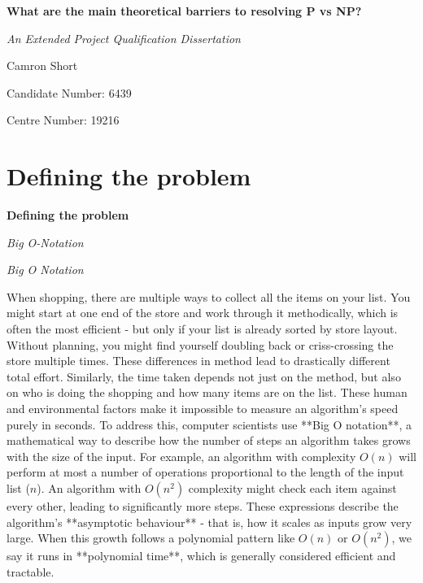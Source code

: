 \documentclass[12pt]{report}
\begin{document}
\begin{titlepage}
    \centering
    \vspace*{3cm}
    
    {\Huge\bfseries What are the main theoretical barriers to resolving P vs NP?\par}
    \vspace{1.5cm}
    
    {\Large\itshape An Extended Project Qualification Dissertation\par}
    \vspace{2cm}
    
    {\Large Camron Short\par}
    \vspace{0.5cm}
    {\large Candidate Number: 6439\par}
    {\large Centre Number: 19216\par}
    \vspace{2cm}
    
    \thispagestyle{empty}
\end{titlepage}

\section*{Defining the problem}
\begin{center}
    \vspace*{3cm}
    {\Huge\bfseries Defining the problem\par}
    \vspace{0.5cm}
    {\Large\itshape Big O-Notation\par}
\end{center}

{\Large\itshape Big O Notation\par}

When shopping, there are multiple ways to collect all the items on your list.
You might start at one end of the store and work through it methodically, which is often the most efficient - but only if your list is already sorted by store layout.
Without planning, you might find yourself doubling back or criss-crossing the store multiple times.
These differences in method lead to drastically different total effort.
Similarly, the time taken depends not just on the method, but also on who is doing the shopping and how many items are on the list.
These human and environmental factors make it impossible to measure an algorithm's speed purely in seconds.
To address this, computer scientists use **Big O notation**, a mathematical way to describe how the number of steps an algorithm takes grows with the size of the input.
For example, an algorithm with complexity $O(n)$ will perform at most a number of operations proportional to the length of the input list ($n$).
An algorithm with $O(n^2)$ complexity might check each item against every other, leading to significantly more steps.
These expressions describe the algorithm’s **asymptotic behaviour** - that is, how it scales as inputs grow very large. When this growth follows a polynomial pattern like $O(n)$ or $O(n^2)$, we say it runs in **polynomial time**, which is generally considered efficient and tractable.
\end{document}

